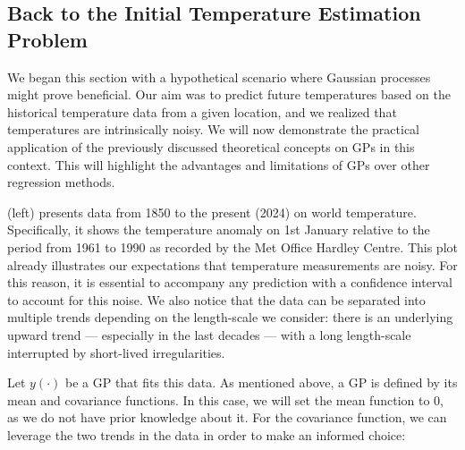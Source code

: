 \subsection{Back to the Initial Temperature Estimation Problem}
We began this section with a hypothetical scenario where Gaussian processes might prove beneficial. Our aim was to predict future temperatures based on the historical temperature data from a given location, and we realized that temperatures are intrinsically noisy. We will now demonstrate the practical application of the previously discussed theoretical concepts on GPs in this context. This will highlight the advantages and limitations of GPs over other regression methods.


 (left) presents data from 1850 to the present (2024) on world temperature. Specifically, it shows the temperature anomaly on 1st January relative to the period from 1961 to 1990 as recorded by the Met Office Hardley Centre. This plot already illustrates our expectations that temperature measurements are noisy. For this reason, it is essential to accompany any prediction with a confidence interval to account for this noise. We also notice that the data can be separated into multiple trends depending on the length-scale we consider: there is an underlying upward trend --- especially in the last decades --- with a long length-scale interrupted by short-lived irregularities.

Let $y(\cdot)$ be a GP that fits this data. As mentioned above, a GP is defined by its mean and covariance functions. In this case, we will set the mean function to 0, as we do not have prior knowledge about it. For the covariance function, we can leverage the two trends in the data in order to make an informed choice:

